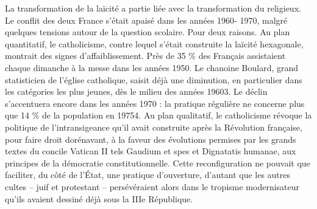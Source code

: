 La transformation de la laïcité a partie liée avec la transformation du religieux. Le conflit des deux France s’était apaisé dans les années 1960- 1970, malgré quelques tensions autour de la question scolaire. Pour deux raisons. Au plan quantitatif, le catholicisme, contre lequel s’était construite la laïcité hexagonale, montrait des signes d’affaiblissement. Près de 35 \% des Français assistaient chaque dimanche à la messe dans les années 1950. Le chanoine Boulard, grand statisticien de l’église catholique, saisit déjà une diminution, en particulier dans les catégories les plus jeunes, dès le milieu des années 19603. Le déclin s’accentuera encore dans les années 1970 : la pratique régulière ne concerne plus que 14 \% de la population en 19754. Au plan qualitatif, le catholicisme révoque la politique de l’intransigeance qu’il avait construite après la Révolution française, pour faire droit dorénavant, à la faveur des évolutions permises par les grands textes du concile Vatican II tels Gaudium et spes et Dignatatis humanae, aux principes de la démocratie constitutionnelle. Cette reconfiguration ne pouvait que faciliter, du côté de l’État, une pratique d’ouverture, d’autant que les autres cultes – juif et protestant – persévéraient alors dans le tropisme modernisateur qu’ils avaient dessiné déjà sous la IIIe République.

